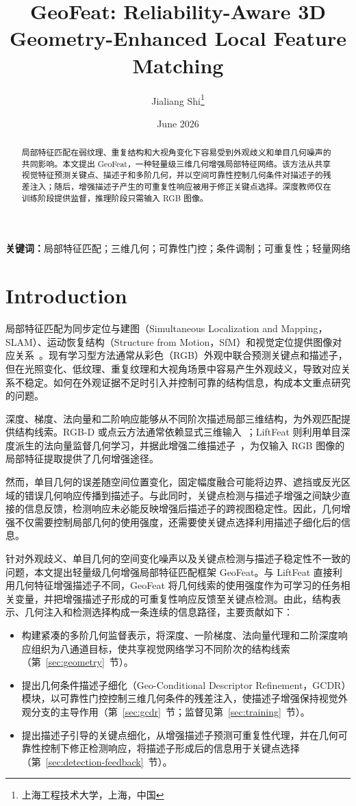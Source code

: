 \documentclass{article}
\title{GeoFeat: Reliability-Aware 3D Geometry-Enhanced Local Feature Matching}
\author{Jialiang Shi\footnote{上海工程技术大学，上海，中国}}
\date{June 2026}
\begin{document}
\maketitle

\begin{abstract}
局部特征匹配在弱纹理、重复结构和大视角变化下容易受到外观歧义和单目几何噪声的共同影响。本文提出 GeoFeat，一种轻量级三维几何增强局部特征网络。该方法从共享视觉特征预测关键点、描述子和多阶几何，并以空间可靠性控制几何条件对描述子的残差注入；随后，增强描述子产生的可重复性响应被用于修正关键点选择。深度教师仅在训练阶段提供监督，推理阶段只需输入 RGB 图像。\end{abstract}

\noindent\textbf{关键词：}局部特征匹配；三维几何；可靠性门控；条件调制；可重复性；轻量网络

\section{Introduction}
局部特征匹配为同步定位与建图（Simultaneous Localization and Mapping，SLAM）、运动恢复结构（Structure from Motion，SfM）和视觉定位提供图像对应关系~\cite{davison_monoslam_2007,Orb-slam2,schoenberger2016sfm,ORBSLAM3_TRO}。现有学习型方法通常从彩色（RGB）外观中联合预测关键点和描述子，但在光照变化、低纹理、重复纹理和大视角场景中容易产生外观歧义，导致对应关系不稳定。如何在外观证据不足时引入并控制可靠的结构信息，构成本文重点研究的问题。

深度、梯度、法向量和二阶响应能够从不同阶次描述局部三维结构，为外观匹配提供结构线索。RGB-D 或点云方法通常依赖显式三维输入~\cite{Zeng2017_3DMatch,Yew2018_3DFeatNet}；LiftFeat 则利用单目深度派生的法向量监督几何学习，并据此增强二维描述子~\cite{LiftFeat}，为仅输入 RGB 图像的局部特征提取提供了几何增强途径。

然而，单目几何的误差随空间位置变化，固定幅度融合可能将边界、遮挡或反光区域的错误几何响应传播到描述子。与此同时，关键点检测与描述子增强之间缺少直接的信息反馈，检测响应未必能反映增强后描述子的跨视图稳定性。因此，几何增强不仅需要控制局部几何的使用强度，还需要使关键点选择利用描述子细化后的信息。

针对外观歧义、单目几何的空间变化噪声以及关键点检测与描述子稳定性不一致的问题，本文提出轻量级几何增强局部特征匹配框架 GeoFeat。与 LiftFeat 直接利用几何特征增强描述子不同，GeoFeat 将几何线索的使用强度作为可学习的任务相关变量，并把增强描述子形成的可重复性响应反馈至关键点检测。由此，结构表示、几何注入和检测选择构成一条连续的信息路径，主要贡献如下：
\begin{itemize}
\item 构建紧凑的多阶几何监督表示，将深度、一阶梯度、法向量代理和二阶深度响应组织为八通道目标，使共享视觉网络学习不同阶次的结构线索（第~\ref{sec:geometry}~节）。
\item 提出几何条件描述子细化（Geo-Conditional Descriptor Refinement，GCDR）模块，以可靠性门控控制三维几何条件的残差注入，使描述子增强保持视觉外观分支的主导作用（第~\ref{sec:gcdr}~节；监督见第~\ref{sec:training}~节）。
\item 提出描述子引导的关键点细化，从增强描述子预测可重复性代理，并在几何可靠性控制下修正检测响应，将描述子形成后的信息用于关键点选择（第~\ref{sec:detection-feedback}~节）。
\end{itemize}
\end{document}
